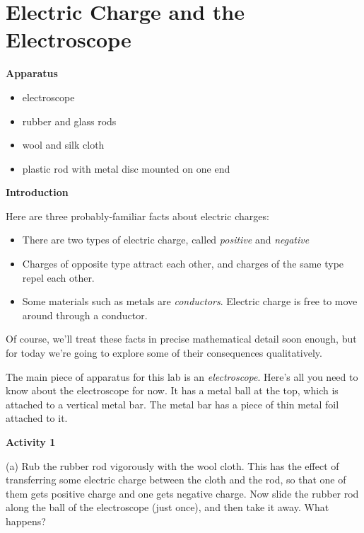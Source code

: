 \section{Electric Charge and the Electroscope}
\begin{comment}
This lab was written by Ted Bunn for spring of 2016.  It was edited slightly by Matt Trawick for this manual in April 2016.

\end{comment}

\makelabheader %

\bigskip
\textbf{Apparatus}
\vspace{-\parskip}
\begin{itemize}
\item electroscope
\item rubber and glass rods
\item wool and silk cloth
\item plastic rod with metal disc mounted on one end
\end{itemize}

\bigskip
\textbf{Introduction}

Here are three probably-familiar facts about electric charges:

\vspace{-\parskip}
\begin{itemize}
\item There are two types of electric charge, called \textit{positive}
and \textit{negative}
\item Charges of opposite type attract each other, and charges of the same type
repel each other.
\item Some materials such as metals are \textit{conductors}. Electric charge 
is free to move around through a conductor. 
\end{itemize}

Of course, we'll treat these facts in precise mathematical detail soon
enough, but for today we're going to explore some of their consequences 
qualitatively.

The main piece of apparatus for this lab is an \textit{electroscope}. 
Here's all you need to know about the electroscope for now. It has
a metal ball at the top, which is attached to a vertical metal bar.
The metal bar has a piece of thin metal foil attached to it. 

\textbf{Activity 1}

(a) Rub the rubber rod vigorously with the wool cloth.
This has the effect of transferring some electric charge between the
cloth and the rod, so that one of them gets positive charge and one gets
negative charge.  Now slide the rubber rod along the ball of the electroscope (just once), and then take it away.
What happens?

